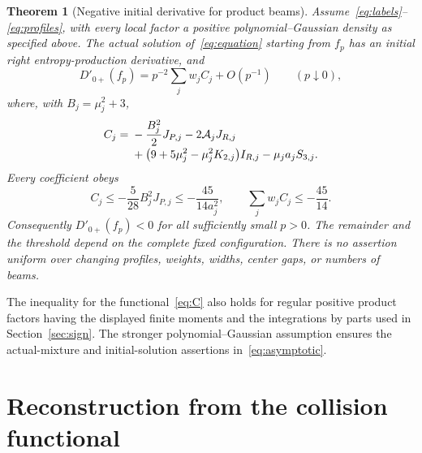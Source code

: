 \documentclass[11pt]{article}
\numberwithin{equation}{section}
\newtheorem{theorem}{Theorem}[section]
\newcommand{\Dzero}{D'_{0+}}
\begin{document}
\begin{theorem}[Negative initial derivative for product beams]\label{thm:main}
Assume~\eqref{eq:labels}--\eqref{eq:profiles}, with every local factor
a positive polynomial--Gaussian density as specified above. The actual
solution of~\eqref{eq:equation} starting from \(f_p\) has an initial
right entropy-production derivative, and
\begin{equation}\label{eq:asymptotic}
 \Dzero(f_p)=p^{-2}\sum_jw_jC_j+O(p^{-1})\qquad(p\downarrow0),
\end{equation}
where, with \(B_j=\mu_j^2+3\),
\begin{align}
 C_j={}&-\frac{B_j^2}{2}J_{P,j}-2\mathcal A_jJ_{R,j}
 \notag\\[-2pt]
 &+\bigl(9+5\mu_j^2-\mu_j^2K_{2,j}\bigr)I_{R,j}
       -\mu_ja_jS_{3,j}.\label{eq:C}
\end{align}
Every coefficient obeys
\begin{equation}\label{eq:sign}
 C_j\leq-\frac5{28}B_j^2J_{P,j}
       \leq-\frac{45}{14a_j^2},\qquad
 \sum_jw_jC_j\leq-\frac{45}{14}.
\end{equation}
Consequently \(\Dzero(f_p)<0\) for all sufficiently small \(p>0\).
The remainder and the threshold depend on the complete fixed
configuration. There is no assertion uniform over changing profiles,
weights, widths, center gaps, or numbers of beams.
\end{theorem}

The inequality for the functional~\eqref{eq:C} also holds for regular
positive product factors having the displayed finite moments and the
integrations by parts used in Section~\ref{sec:sign}. The stronger
polynomial--Gaussian assumption ensures the actual-mixture and
initial-solution assertions in~\eqref{eq:asymptotic}.

\section{Reconstruction from the collision functional}\label{sec:coefficient}
\end{document}
